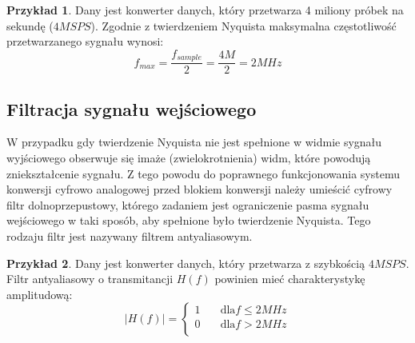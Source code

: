 \documentclass[10pt,a4paper,twoside]{report}
\theoremstyle{definition}
\theoremstyle{definition}
\theoremstyle{definition}
\newtheorem{przyklad}{Przykład}[section]
\theoremstyle{definition}
\theoremstyle{definition}
\begin{document}
	\begin{przyklad}{Dany jest konwerter danych, który przetwarza 4 miliony próbek na sekundę ($4MSPS$). Zgodnie z twierdzeniem Nyquista maksymalna częstotliwość przetwarzanego sygnału wynosi:}
		\begin{equation}
			f_{max} = \frac{f_{sample}}{2} = \frac{4M}{2} = 2MHz
		\end{equation}
	\end{przyklad}
	
	\subsection{Filtracja sygnału wejściowego}
	{	W przypadku gdy twierdzenie Nyquista nie jest spełnione w widmie sygnału wyjściowego obserwuje się imaże (zwielokrotnienia) widm, które powodują zniekształcenie sygnału. Z tego powodu do poprawnego funkcjonowania systemu konwersji cyfrowo analogowej przed blokiem konwersji należy umieścić cyfrowy filtr dolnoprzepustowy, którego zadaniem jest ograniczenie pasma sygnału wejściowego w taki sposób, aby spełnione było twierdzenie Nyquista. Tego rodzaju filtr jest nazywany filtrem antyaliasowym. }
	
	\begin{przyklad}{Dany jest konwerter danych, który przetwarza z szybkością $4MSPS$. Filtr antyaliasowy o transmitancji $H(f)$ powinien mieć charakterystykę amplitudową:}
		\[   
		|H(f)| = 
		\begin{cases}
			1 &\quad \text{dla} f \le 2MHz\\
			0 &\quad \text{dla} f>2MHz\\
		\end{cases}
		\]		
	\end{przyklad}
	\begin{figure}[!htb]
	\centering
	\end{figure}
		
\end{document}
